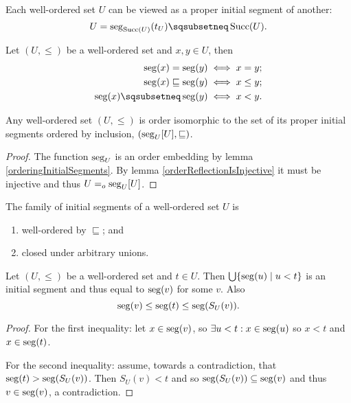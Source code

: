 Each well-ordered set $U$ can be viewed as a proper initial segment of another:
\[ U = \seg_{\operatorname{Succ}(U)}(t_U)\sqsubsetneq \operatorname{Succ}(U). \]
\begin{lemma} \label{orderingInitialSegments}
Let $(U,\leq)$ be a well-ordered set and $x,y\in U$, then
\begin{align*}
\seg(x) = \seg(y) &\iff x = y; \\
\seg(x) \sqsubseteq \seg(y) &\iff x \leq y; \\
\seg(x) \sqsubsetneq \seg(y) &\iff x < y.
\end{align*}
\end{lemma}
\begin{proposition} \label{wosetIsomorphicToInitialSegments}
Any well-ordered set $(U,\leq)$ is order isomorphic to the set of its proper initial segments ordered by inclusion, $(\operatorname{seg}_U[U], \sqsubseteq)$.
\end{proposition}
\begin{proof}
The function $\operatorname{seg}_U$ is an order embedding by lemma \ref{orderingInitialSegments}. By lemma \ref{orderReflectionIsInjective} it must be injective and thus $U =_o \operatorname{seg}_U[U]$.
\end{proof}
\begin{lemma}
The family of initial segments of a well-ordered set $U$ is
\begin{enumerate}
\item well-ordered by $\sqsubseteq$; and
\item closed under arbitrary unions.
\end{enumerate}
\end{lemma}
\begin{lemma} \label{unionInitialSegments}
Let $(U,\leq)$ be a well-ordered set and $t\in U$. Then $\bigcup\{ \operatorname{seg}(u)\;|\; u<t \}$ is an initial segment and thus equal to $\operatorname{seg}(v)$ for some $v$. Also
\[ \operatorname{seg}(v) \leq \operatorname{seg}(t) \leq \operatorname{seg}(S_U(v)). \]
\end{lemma}
\begin{proof}
For the first inequality: let $x\in \operatorname{seg}(v)$, so $\exists u<t: x\in\operatorname{seg}(u)$ so $x<t$ and $x\in \operatorname{seg}(t)$.

For the second inequality: assume, towards a contradiction, that $\operatorname{seg}(t)>\operatorname{seg}(S_U(v))$. Then $S_U(v) < t$ and so $\operatorname{seg}(S_U(v))\subseteq \operatorname{seg}(v)$ and thus $v\in\operatorname{seg}(v)$, a contradiction.
\end{proof}

